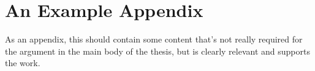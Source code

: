 \def\chapdir{./Appendix}

\chapter{An Example Appendix}\label{ap:something}

As an appendix, this should contain some content that's not really required for the argument in the main body of the thesis, but is clearly relevant and supports the work.




